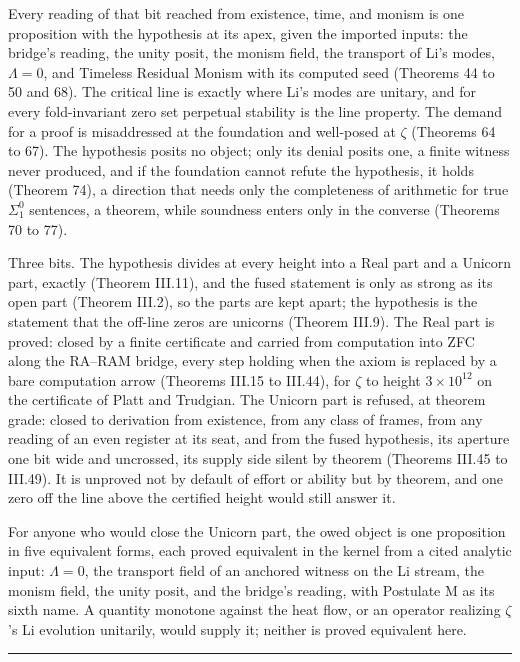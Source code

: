 \documentclass[10pt,twocolumn]{article}
\newcommand{\jboxstart}{\begin{jbox}}
\newenvironment{jbox}{\par\vspace{2pt}\noindent\color{accent}\rule{\columnwidth}{0.8pt}\par\vspace{-2pt}\small}{\par\vspace{2pt}}
\begin{document}
Every reading of that bit reached from existence, time, and monism is
one proposition with the hypothesis at its apex, given the imported
inputs: the bridge's reading, the unity posit, the monism field, the
transport of Li's modes, \(\Lambda = 0\), and Timeless Residual Monism
with its computed seed (Theorems 44 to 50 and 68). The critical line is
exactly where Li's modes are unitary, and for every fold-invariant zero
set perpetual stability is the line property. The demand for a proof is
misaddressed at the foundation and well-posed at \(\zeta\) (Theorems 64
to 67). The hypothesis posits no object; only its denial posits one, a
finite witness never produced, and if the foundation cannot refute the
hypothesis, it holds (Theorem 74), a direction that needs only the
completeness of arithmetic for true \(\Sigma^0_1\) sentences, a theorem,
while soundness enters only in the converse (Theorems 70 to 77).

Three bits. The hypothesis divides at every height into a Real part and
a Unicorn part, exactly (Theorem III.11), and the fused statement is
only as strong as its open part (Theorem III.2), so the parts are kept
apart; the hypothesis is the statement that the off-line zeros are
unicorns (Theorem III.9). The Real part is proved: closed by a finite
certificate and carried from computation into ZFC along the RA--RAM
bridge, every step holding when the axiom is replaced by a bare
computation arrow (Theorems III.15 to III.44), for \(\zeta\) to height
\(3 \times 10^{12}\) on the certificate of Platt and Trudgian. The
Unicorn part is refused, at theorem grade: closed to derivation from
existence, from any class of frames, from any reading of an even
register at its seat, and from the fused hypothesis, its aperture one
bit wide and uncrossed, its supply side silent by theorem (Theorems
III.45 to III.49). It is unproved not by default of effort or ability
but by theorem, and one zero off the line above the certified height
would still answer it.

For anyone who would close the Unicorn part, the owed object is one
proposition in five equivalent forms, each proved equivalent in the
kernel from a cited analytic input: \(\Lambda = 0\), the transport field
of an anchored witness on the Li stream, the monism field, the unity
posit, and the bridge's reading, with Postulate M as its sixth name. A
quantity monotone against the heat flow, or an operator realizing
\(\zeta\)'s Li evolution unitarily, would supply it; neither is proved
equivalent here.

\jboxstart
\end{document}
